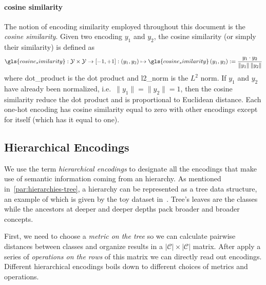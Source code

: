 \paragraph{cosine similarity} The notion of encoding similarity employed
throughout this document is the \emph{cosine similarity}. Given two encoding $y_1$ and $y_2$, the cosine similarity (or simply their similarity) is defined as
\begin{equation}
  \gls{cosine_similarity}: \mathcal{Y} \times \mathcal{Y} \to \left[-1, +1\right]
  : (y_1, y_2) \mapsto \gls{cosine_similarity} \,(y_1, y_2) :=
  \frac{y_1 \cdot y_2}{\|y_1\| \, \|y_2\|}
  \label{eq:cosine-simiarity}
\end{equation}
where \gls{dot_product} is the dot product and \gls{l2_norm} is the $L^2$ norm.
If $y_1$ and $y_2$ have already been normalized, i.e.\ $\|y_1\| = \|y_2\| = 1$, then the cosine similarity reduce the dot product and is proportional to Euclidean distance. Each one-hot encoding has cosine similarity equal to zero with other encodings except for itself (which has it equal to one).


\subsection{Hierarchical Encodings}
\label{subsec:hierarchical-encodings}

We use the term \emph{hierarchical encodings} to designate all the encodings that make use of semantic information coming from an hierarchy. As mentioned in~\cref{par:hierarchies-tree}, a hierarchy can be represented as a tree data structure, an example of which is given by the toy dataset in~. Tree's leaves are the classes while the ancestors at deeper and deeper depths pack broader and broader concepts.

First, we need to choose a \emph{metric on the tree} so we can calculate pairwise distances between classes and organize results in a $|\mathcal{C}| \times |\mathcal{C}|$ matrix. After apply a series of \emph{operations on the rows} of this matrix we can directly read out encodings. Different hierarchical encodings boils down to different choices of metrics and operations.

